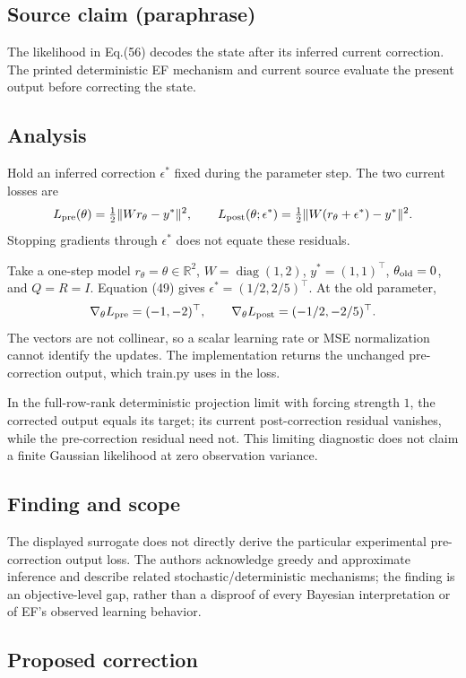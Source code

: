 \documentclass[11pt]{article}
\begin{document}
\subsection*{Source claim (paraphrase)}

The likelihood in Eq.(56) decodes the state after its inferred current correction. The printed deterministic EF mechanism and current source evaluate the present output before correcting the state.

\subsection*{Analysis}

Hold an inferred correction \(\epsilon^*\) fixed during the parameter step. The two current losses are \[L_{\rm pre}(\theta)=\tfrac12\|Wr_\theta-y^*\|^2,\qquad L_{\rm post}(\theta;\epsilon^*)=\tfrac12\|W(r_\theta+\epsilon^*)-y^*\|^2.\] Stopping gradients through \(\epsilon^*\) does not equate these residuals.

Take a one-step model \(r_\theta=\theta\in\mathbb R^2\), \(W=\operatorname{diag}(1,2)\), \(y^*=(1,1)^\top\), \(\theta_{\rm old}=0\), and \(Q=R=I\). Equation (49) gives \(\epsilon^*=(1/2,2/5)^\top\). At the old parameter, \[\nabla_\theta L_{\rm pre}=(-1,-2)^\top,\qquad \nabla_\theta L_{\rm post}=(-1/2,-2/5)^\top.\] The vectors are not collinear, so a scalar learning rate or MSE normalization cannot identify the updates. The implementation returns the unchanged pre-correction output, which train.py uses in the loss.

In the full-row-rank deterministic projection limit with forcing strength \(1\), the corrected output equals its target; its current post-correction residual vanishes, while the pre-correction residual need not. This limiting diagnostic does not claim a finite Gaussian likelihood at zero observation variance.

\subsection*{Finding and scope}

The displayed surrogate does not directly derive the particular experimental pre-correction output loss. The authors acknowledge greedy and approximate inference and describe related stochastic/deterministic mechanisms; the finding is an objective-level gap, rather than a disproof of every Bayesian interpretation or of EF’s observed learning behavior.

\subsection*{Proposed correction}
\end{document}
